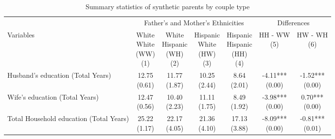 \begin{table}[t]
\tablefont
\caption{Summary statistics of synthetic parents by couple type \label{tab:synth}}
\begin{threeparttable}
\begin{tabular}[t]{>{\raggedright\arraybackslash}p{5cm}cccccc}
\toprule
\multicolumn{1}{c}{ } & \multicolumn{4}{c}{Father's and Mother's Ethnicities} & \multicolumn{2}{c}{Differences} \\
\cmidrule(l{3pt}r{3pt}){2-5} \cmidrule(l{3pt}r{3pt}){6-7}
Variables & \specialcell{White \\ White \\ (WW) \\ (1)} & \specialcell{White \\ Hispanic \\ (WH) \\ (2)} & \specialcell{Hispanic \\ White \\ (HW) \\ (3)} & \specialcell{Hispanic \\ Hispanic \\ (HH) \\ (4)} & \specialcell{HH - WW \\ (5)} & \specialcell{HW - WH \\ (6)}\\
\midrule
Husband's education (Total Years) & \specialcell{12.75\\(0.61)} & \specialcell{11.77\\(1.87)} & \specialcell{10.25\\(2.44)} & \specialcell{8.64\\(2.01)} & \specialcell{-4.11***\\(0.00)} & \specialcell{-1.52***\\(0.00)}\\
Wife's education (Total Years) & \specialcell{12.47\\(0.56)} & \specialcell{10.40\\(2.23)} & \specialcell{11.11\\(1.75)} & \specialcell{8.49\\(1.92)} & \specialcell{-3.98***\\(0.00)} & \specialcell{0.70***\\(0.00)}\\
Total Household education (Total Years) & \specialcell{25.22\\(1.17)} & \specialcell{22.17\\(4.05)} & \specialcell{21.36\\(4.10)} & \specialcell{17.13\\(3.88)} & \specialcell{-8.09***\\(0.00)} & \specialcell{-0.81***\\(0.01)}\\

\end{tabular}
\end{threeparttable}
\end{table}
